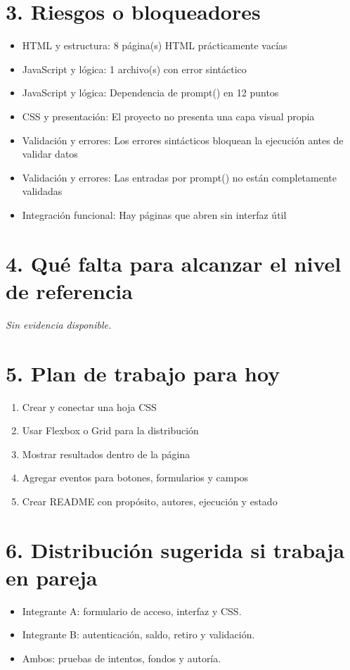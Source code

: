 \documentclass[10pt,a4paper]{article}
\begin{document}
\section*{3. Riesgos o bloqueadores}
\begin{itemize}
\item HTML y estructura: 8 página(s) HTML prácticamente vacías
\item JavaScript y lógica: 1 archivo(s) con error sintáctico
\item JavaScript y lógica: Dependencia de prompt() en 12 puntos
\item CSS y presentación: El proyecto no presenta una capa visual propia
\item Validación y errores: Los errores sintácticos bloquean la ejecución antes de validar datos
\item Validación y errores: Las entradas por prompt() no están completamente validadas
\item Integración funcional: Hay páginas que abren sin interfaz útil
\end{itemize}


\newpage
\section*{4. Qué falta para alcanzar el nivel de referencia}
\emph{Sin evidencia disponible.}
\section*{5. Plan de trabajo para hoy}
\begin{enumerate}
\item Crear y conectar una hoja CSS
\item Usar Flexbox o Grid para la distribución
\item Mostrar resultados dentro de la página
\item Agregar eventos para botones, formularios y campos
\item Crear README con propósito, autores, ejecución y estado
\end{enumerate}
\section*{6. Distribución sugerida si trabaja en pareja}
\begin{itemize}
\item Integrante A: formulario de acceso, interfaz y CSS.
\item Integrante B: autenticación, saldo, retiro y validación.
\item Ambos: pruebas de intentos, fondos y autoría.
\end{itemize}
\end{document}
